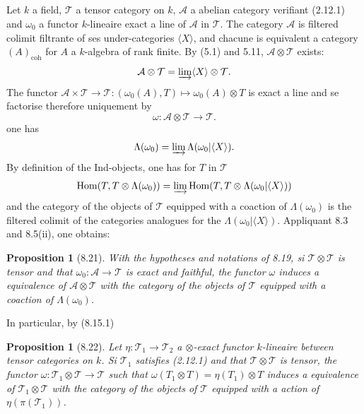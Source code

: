 \documentclass[12pt,a4paper]{article}
\theoremstyle{plain}
\newtheorem{proposition}[theorem]{Proposition}
\theoremstyle{definition}
\DeclareMathOperator{\Hom}{Hom}
\newcommand{\coh}{\mathrm{coh}}
\begin{document}
\subsection{}

Let $k$ a field, $\mathcal{T}$ a tensor category on $k$, $\mathcal{A}$ a abelian category verifiant (2.12.1) and $\omega_0$ a functor $k$-lineaire exact a line of $\mathcal{A}$ in $\mathcal{T}$. The category $\mathcal{A}$ is filtered colimit filtrante of ses under-categories $\langle X \rangle$, and chacune is equivalent a category $(A)_{\coh}$ for $A$ a $k$-algebra of rank finite. By (5.1) and 5.11, $\mathcal{A} \otimes \mathcal{T}$ exists:
\[
\mathcal{A} \otimes \mathcal{T} = \varinjlim \langle X \rangle \otimes \mathcal{T}.
\]
The functor $\mathcal{A} \times \mathcal{T} \to \mathcal{T} : (\omega_0(A), T) \mapsto \omega_0(A) \otimes T$ is exact a line and se factorise therefore uniquement by
\[
\omega : \mathcal{A} \otimes \mathcal{T} \to \mathcal{T}.
\]
one has
\[
\Lambda(\omega_0) = \varinjlim \Lambda(\omega_0 | \langle X \rangle).
\]
By definition of the Ind-objects, one has for $T$ in $\mathcal{T}$
\[
\Hom(T, T \otimes \Lambda(\omega_0)) = \varinjlim \Hom(T, T \otimes \Lambda(\omega_0 | \langle X \rangle))
\]
and the category of the objects of $\mathcal{T}$ equipped with a coaction of $\Lambda(\omega_0)$ is the filtered colimit of the categories analogues for the $\Lambda(\omega_0 | \langle X \rangle)$. Appliquant 8.3 and 8.5(ii), one obtains:

\begin{proposition}[8.21]
With the hypotheses and notations of 8.19, si $\mathcal{T} \otimes \mathcal{T}$ is tensor and that $\omega_0 : \mathcal{A} \to \mathcal{T}$ is exact and faithful, the functor $\omega$ induces a equivalence of $\mathcal{A} \otimes \mathcal{T}$ with the category of the objects of $\mathcal{T}$ equipped with a coaction of $\Lambda(\omega_0)$.
\end{proposition}

In particular, by (8.15.1)
\begin{proposition}[8.22]
Let $\eta : \mathcal{T}_1 \to \mathcal{T}_2$ a $\otimes$-exact functor $k$-lineaire between tensor categories on $k$. Si $\mathcal{T}_1$ satisfies (2.12.1) and that $\mathcal{T} \otimes \mathcal{T}$ is tensor, the functor $\omega : \mathcal{T}_1 \otimes \mathcal{T} \to \mathcal{T}$ such that $\omega(T_1 \otimes T) = \eta(T_1) \otimes T$ induces a equivalence of $\mathcal{T}_1 \otimes \mathcal{T}$ with the category of the objects of $\mathcal{T}$ equipped with a action of $\eta(\pi(\mathcal{T}_1))$.
\end{proposition}
\end{document}
